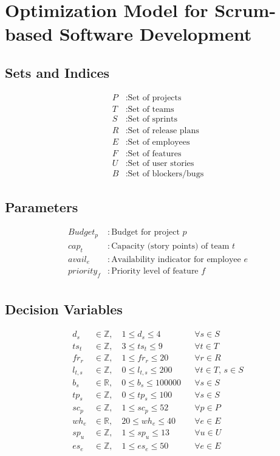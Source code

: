 \documentclass{article}
\begin{document}
\section*{Optimization Model for Scrum-based Software Development}

\subsection*{Sets and Indices}
\begin{align*}
P & : \text{Set of projects}\\
T & : \text{Set of teams}\\
S & : \text{Set of sprints}\\
R & : \text{Set of release plans}\\
E & : \text{Set of employees}\\
F & : \text{Set of features}\\
U & : \text{Set of user stories}\\
B & : \text{Set of blockers/bugs}
\end{align*}

\subsection*{Parameters}
\begin{align*}
Budget_p &: \text{Budget for project } p \\
cap_t &: \text{Capacity (story points) of team } t \\
avail_e &: \text{Availability indicator for employee } e \\
priority_f &: \text{Priority level of feature } f \\
\end{align*}

\subsection*{Decision Variables}
\begin{align*}
d_s &\in \mathbb{Z},\quad 1 \le d_s \le 4 &&\forall s\in S \\
ts_t &\in \mathbb{Z},\quad 3 \le ts_t \le 9 &&\forall t\in T \\
fr_r &\in \mathbb{Z},\quad 1 \le fr_r \le 20 &&\forall r\in R \\
l_{t,s} &\in \mathbb{Z},\quad 0 \le l_{t,s} \le 200 &&\forall t\in T,\,s\in S \\
b_s &\in \mathbb{R},\quad 0 \le b_s \le 100000 &&\forall s\in S \\
tp_s &\in \mathbb{Z},\quad 0 \le tp_s \le 100 &&\forall s\in S \\
sc_p &\in \mathbb{Z},\quad 1 \le sc_p \le 52 &&\forall p\in P \\
wh_e &\in \mathbb{R},\quad 20 \le wh_e \le 40 &&\forall e\in E \\
sp_u &\in \mathbb{Z},\quad 1 \le sp_u \le 13 &&\forall u\in U \\
es_e &\in \mathbb{Z},\quad 1 \le es_e \le 50 &&\forall e\in E
\end{align*}
\end{document}
